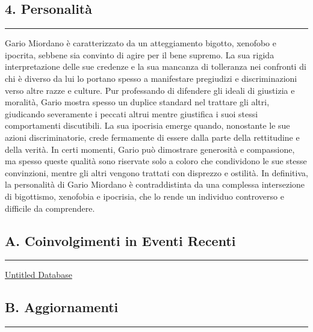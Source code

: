 \subsection{4. Personalità}\label{personalituxe0}

\begin{center}\rule{0.5\linewidth}{0.5pt}\end{center}

Gario Miordano è caratterizzato da un atteggiamento bigotto, xenofobo e
ipocrita, sebbene sia convinto di agire per il bene supremo. La sua
rigida interpretazione delle sue credenze e la sua mancanza di
tolleranza nei confronti di chi è diverso da lui lo portano spesso a
manifestare pregiudizi e discriminazioni verso altre razze e culture.
Pur professando di difendere gli ideali di giustizia e moralità, Gario
mostra spesso un duplice standard nel trattare gli altri, giudicando
severamente i peccati altrui mentre giustifica i suoi stessi
comportamenti discutibili. La sua ipocrisia emerge quando, nonostante le
sue azioni discriminatorie, crede fermamente di essere dalla parte della
rettitudine e della verità. In certi momenti, Gario può dimostrare
generosità e compassione, ma spesso queste qualità sono riservate solo a
coloro che condividono le sue stesse convinzioni, mentre gli altri
vengono trattati con disprezzo e ostilità. In definitiva, la personalità
di Gario Miordano è contraddistinta da una complessa intersezione di
bigottismo, xenofobia e ipocrisia, che lo rende un individuo controverso
e difficile da comprendere.

\subsection{A. Coinvolgimenti in Eventi
Recenti}\label{a.-coinvolgimenti-in-eventi-recenti}

\begin{center}\rule{0.5\linewidth}{0.5pt}\end{center}

\href{Untitled\%20Database\%20d1df3a4c45d8458898cd664d89bf227a.csv}{Untitled
Database}

\subsection{B. Aggiornamenti}\label{b.-aggiornamenti}

\begin{center}\rule{0.5\linewidth}{0.5pt}\end{center}

\href{Untitled\%20878d7951acff43338f7728378c4730bf.csv}{}
